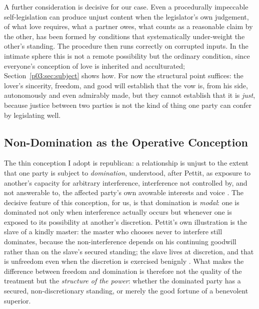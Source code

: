 \documentclass[11pt,a4paper]{article}
\begin{document}
A further consideration is decisive for our case. Even a procedurally impeccable self-legislation can produce unjust content when the legislator's own judgement, of what love requires, what a partner owes, what counts as a reasonable claim by the other, has been formed by conditions that systematically under-weight the other's standing. The procedure then runs correctly on corrupted inputs. In the intimate sphere this is not a remote possibility but the ordinary condition, since everyone's conception of love is inherited and acculturated; Section~\ref{p03:sec:subject} shows how. For now the structural point suffices: the lover's sincerity, freedom, and good will establish that the vow is, from his side, autonomously and even admirably made, but they cannot establish that it is \emph{just}, because justice between two parties is not the kind of thing one party can confer by legislating well.

\subsection{Non-Domination as the Operative Conception}

The thin conception I adopt is republican: a relationship is unjust to the extent that one party is subject to \emph{domination}, understood, after Pettit, as exposure to another's capacity for arbitrary interference, interference not controlled by, and not answerable to, the affected party's own avowable interests and voice \parencite{pettit1997republicanism}. The decisive feature of this conception, for us, is that domination is \emph{modal}: one is dominated not only when interference actually occurs but whenever one is exposed to its possibility at another's discretion. Pettit's own illustration is the slave of a kindly master: the master who chooses never to interfere still dominates, because the non-interference depends on his continuing goodwill rather than on the slave's secured standing; the slave lives at discretion, and that is unfreedom even when the discretion is exercised benignly \parencite{pettit1997republicanism}. What makes the difference between freedom and domination is therefore not the quality of the treatment but the \emph{structure of the power}: whether the dominated party has a secured, non-discretionary standing, or merely the good fortune of a benevolent superior.
\end{document}
